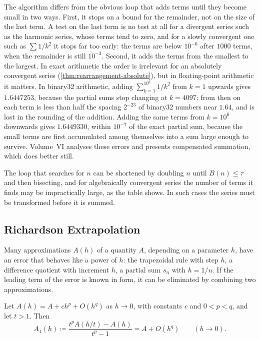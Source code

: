 The algorithm differs from the obvious loop that adds terms until they become small in two ways. First, it stops on a bound for the remainder, not on the size of the last term. A test on the last term is no test at all for a divergent series such as the harmonic series, whose terms tend to zero, and for a slowly convergent one such as $\sum1/k^2$ it stops far too early: the terms are below $10^{-6}$ after $1000$ terms, when the remainder is still $10^{-3}$. Second, it adds the terms from the smallest to the largest. In exact arithmetic the order is irrelevant for an absolutely convergent series (\cref{thm:rearrangement-absolute}), but in floating-point arithmetic it matters. In binary32 arithmetic, adding $\sum_{k=1}^{10^6}1/k^2$ from $k=1$ upwards gives $1.6447253$, because the partial sums stop changing at $k=4097$: from then on each term is less than half the spacing $2^{-23}$ of binary32 numbers near $1.64$, and is lost in the rounding of the addition. Adding the same terms from $k=10^6$ downwards gives $1.6449330$, within $10^{-7}$ of the exact partial sum, because the small terms are first accumulated among themselves into a sum large enough to survive. Volume~VI analyses these errors and presents compensated summation, which does better still.

The loop that searches for $n$ can be shortened by doubling $n$ until $B(n)\le\tau$ and then bisecting, and for algebraically convergent series the number of terms it finds may be impractically large, as the table shows. In such cases the series must be transformed before it is summed.

\subsection{Richardson Extrapolation}

Many approximations $A(h)$ of a quantity $A$, depending on a parameter $h$, have an error that behaves like a power of $h$: the trapezoidal rule with step $h$, a difference quotient with increment $h$, a partial sum $s_n$ with $h=1/n$. If the leading term of the error is known in form, it can be eliminated by combining two approximations.

\begin{proposition}
\label{prop:richardson}
Let $A(h)=A+ch^p+O(h^q)$ as $h\to0$, with constants $c$ and $0<p<q$, and let $t>1$. Then
\[
A_1(h)\coloneqq\frac{t^pA(h/t)-A(h)}{t^p-1}=A+O(h^q)\qquad(h\to0).
\]
\end{proposition}


